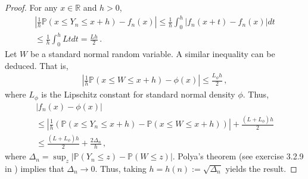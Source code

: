 \documentclass[12pt]{article}
\def\l{\left}
\def\r{\right}
\newcommand{\mb}{\mathbb}
\theoremstyle{thmstyletwo}%
\theoremstyle{thmstylethree}%
\begin{document}
\begin{proof}
    For any $x \in \mb R$ and $h > 0$,
    \begin{multline*}
        \l\lvert \frac{1}{h}\mb P\l(x \leq Y_n \leq x + h\r) - f_n(x) \r\rvert \leq \frac{1}{h}\int_0^{h} \lvert f_n(x + t) - f_n(x) \rvert dt \\
        \leq \frac{1}{h} \int_0^h L t dt = \frac{Lh}{2}\,.
    \end{multline*}
    Let $W$ be a standard normal random variable. A similar inequality can be deduced. That is,
    \begin{align*}
         \l\lvert \frac{1}{h}\mb P\l(x \leq W \leq x + h\r) - \phi(x) \r\rvert \leq  \frac{L_\phi h}{2}\,,
    \end{align*}
    where $L_\phi$ is the Lipschitz constant for standard normal density $\phi$. Thus,
    \begin{multline*}
        \l\lvert f_n(x) - \phi(x)\r\rvert \\
        \leq \l\lvert \frac{1}{h}\l(\mb P\l(x \leq Y_n \leq x + h\r) - \mb P(x \leq W \leq x+h)\r)\r\rvert + \frac{(L + L_\phi)h}{2}  \\
        \leq \frac{(L + L_\phi)h}{2} + \frac{2\Delta_n}{h}\,,
    \end{multline*}
    where $\Delta_n = \sup_z \l\lvert \mb P(Y_n \leq z) - \mb P(W \leq z)\r\rvert$. Polya's theorem (see exercise 3.2.9 in \cite{durrett2019probability}) implies that $\Delta_n \rightarrow 0$. Thus, taking $h = h(n) := \sqrt{\Delta_n}$ yields the result.
\end{proof}








\end{document}

